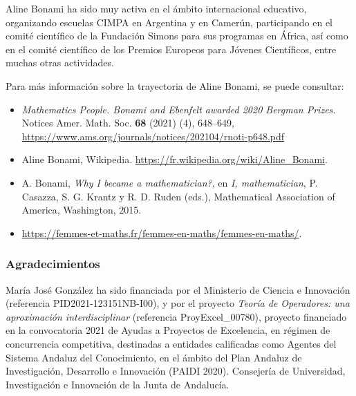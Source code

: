 \documentclass[autocontact]{gaceta}
\begin{document}
Aline Bonami ha sido muy activa en el ámbito internacional educativo, organizando escuelas CIMPA en Argentina y en Camerún, participando en el comité científico de la Fundación Simons para sus programas en África, así como en el comité científico de los Premios Europeos para Jóvenes Científicos, entre muchas otras actividades.

Para más información sobre la trayectoria de Aline Bonami, se puede consultar:

\begin{itemize}
\item \emph{Mathematics People. Bonami and Ebenfelt awarded 2020 Bergman Prizes.} Notices Amer. Math. Soc. \textbf{68} (2021) (4), 648--649,
\url{https://www.ams.org/journals/notices/202104/rnoti-p648.pdf}

\item Aline Bonami, Wikipedia. \url{https://fr.wikipedia.org/wiki/Aline_Bonami}.

\item A. Bonami, \emph{Why I became a mathematician?}, en \emph{I, mathematician}, P. Casazza, S. G. Krantz y R. D. Ruden (eds.), Mathematical Association of America, Washington, 2015.

\item \url{https://femmes-et-maths.fr/femmes-en-maths/femmes-en-maths/}.
\end{itemize}

\subsubsection*{Agradecimientos}

María José González ha sido financiada por el Ministerio de Ciencia e Innovación (referencia PID2021-123151NB-I00), y por el proyecto \emph{Teoría de Operadores: una aproximación interdisciplinar} (referencia ProyExcel\_00780), proyecto financiado en la convocatoria 2021 de Ayudas a Proyectos de Excelencia, en régimen de concurrencia competitiva, destinadas a entidades calificadas como Agentes del Sistema Andaluz del Conocimiento, en el ámbito del Plan Andaluz de Investigación, Desarrollo e Innovación (PAIDI 2020). Consejería de Universidad, Investigación e Innovación de la Junta de Andalucía.
\end{document}
